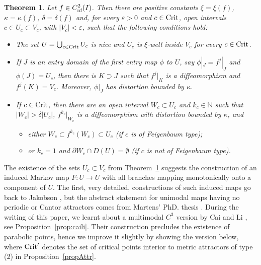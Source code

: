 \documentclass[12pt, psamsfonts, reqno]{amsart}
\newtheorem{theorem}{Theorem}
\begin{document}
\begin{theorem} \label{thm:lemma11}
 Let $f\in {C^2_{\text{\rm nf}}}(I)$.
 Then there are positive constants $\xi=\xi(f)$, $\kappa=\kappa(f)$,
 $\delta=\delta(f)$ and, for every ${\varepsilon}>0$ and $c \in {\mathop{\rm Crit}\nolimits}$, open
 intervals $c\in U_c\subset V_c$, with $|V_c|<{\varepsilon}$,
 such that the following conditions hold:
 \begin{itemize}
  \item[(i)] The set $U=\bigcup_{c\in
    {\mathop{\rm Crit}\nolimits}} U_c$ is nice and $U_c$ is $\xi$-well inside $V_c$
    for every $c\in {\mathop{\rm Crit}\nolimits}$.
  \item[(ii)] If  $J$ is an entry domain of the first entry map
    $\phi$ to $U$, say $\phi|_J=f^j|_J$ and $\phi(J)=U_c$, then
    there is $K\supset J$ such that $f^j|_K$ is a diffeomorphism
    and $f^j(K)=V_c$. Moreover, $\phi|_J$ has distortion bounded by $\kappa$.
  \item[(iii)] If $c\in {\mathop{\rm Crit}\nolimits}$,
    then there are an open interval
    $W_c\subset U_c$ and $k_c \in {{\mathbb N}}$ such that $|W_c|>\delta|U_c|$,
    $f^{k_c}|_{W_c}$ is a diffeomorphism with distortion bounded by $\kappa$, and
\begin{itemize}
\item either $W_c\subset
    f^{k_c}(W_c)\subset U_c$ (if $c$ is of Feigenbaum type);
\item or
    $k_c=1$ and $\partial W_c\cap D(U)=\emptyset$
    (if $c$ is not of Feigenbaum type).
 \end{itemize}
 \end{itemize}
\end{theorem}

The existence of the sets $U_c \subset V_c$ from
Theorem~\ref{thm:lemma11} suggests the construction of an induced
Markov map $F:U \to U$ with all branches mapping monotonically
onto a component of $U$. The first, very detailed, constructions
of such induced maps go back to Jakobson \cite{Jak}, but the
abstract statement for unimodal maps having no periodic or Cantor
attractors comes from Martens' PhD. thesis \cite{martens}. During
the writing of this paper, we learnt about a multimodal $C^3$
version by Cai and Li \cite{caili}, see Proposition~\ref{prop:caili}.
Their construction precludes
the existence of parabolic points, hence we improve it slightly by
showing the version below, where ${\mathop{\rm Crit}\nolimits}'$ denotes the set of
critical points  interior to metric attractors of type (2) in
Proposition~\ref{propAttr}.
\end{document}
